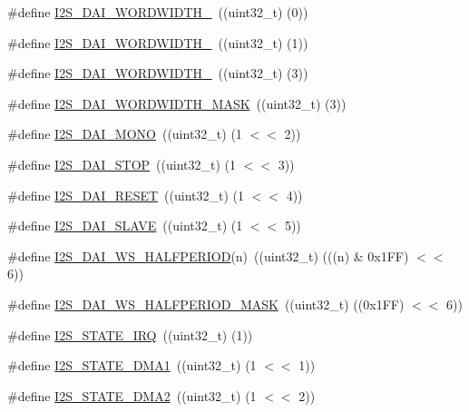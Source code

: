 \begin{DoxyCompactItemize}
\#define \hyperlink{group___i2_s__18_x_x__43_x_x_ga8bd50ada05c4cd981f07be7a3b1002dc}{I2\+S\+\_\+\+D\+A\+I\+\_\+\+W\+O\+R\+D\+W\+I\+D\+T\+H\+\_}~((uint32\+\_\+t) (0))
\item 
\#define \hyperlink{group___i2_s__18_x_x__43_x_x_ga26e60492415a246afde8d4ede5aa292e}{I2\+S\+\_\+\+D\+A\+I\+\_\+\+W\+O\+R\+D\+W\+I\+D\+T\+H\+\_}~((uint32\+\_\+t) (1))
\item 
\#define \hyperlink{group___i2_s__18_x_x__43_x_x_ga576561248aa7e6f27c5ef6c51def80ed}{I2\+S\+\_\+\+D\+A\+I\+\_\+\+W\+O\+R\+D\+W\+I\+D\+T\+H\+\_}~((uint32\+\_\+t) (3))
\item 
\#define \hyperlink{group___i2_s__18_x_x__43_x_x_ga1177f9594c24141162839aafe829fcb9}{I2\+S\+\_\+\+D\+A\+I\+\_\+\+W\+O\+R\+D\+W\+I\+D\+T\+H\+\_\+\+M\+A\+SK}~((uint32\+\_\+t) (3))
\item 
\#define \hyperlink{group___i2_s__18_x_x__43_x_x_ga352feb095d028efc44d17f72beacfae5}{I2\+S\+\_\+\+D\+A\+I\+\_\+\+M\+O\+NO}~((uint32\+\_\+t) (1 $<$$<$ 2))
\item 
\#define \hyperlink{group___i2_s__18_x_x__43_x_x_ga2ed2d2a9f59339ad3cf1f28a78bfcad6}{I2\+S\+\_\+\+D\+A\+I\+\_\+\+S\+T\+OP}~((uint32\+\_\+t) (1 $<$$<$ 3))
\item 
\#define \hyperlink{group___i2_s__18_x_x__43_x_x_gae57a0b564a399a726a9a6737f5733beb}{I2\+S\+\_\+\+D\+A\+I\+\_\+\+R\+E\+S\+ET}~((uint32\+\_\+t) (1 $<$$<$ 4))
\item 
\#define \hyperlink{group___i2_s__18_x_x__43_x_x_ga664f6b8ac38d7b3a23aae4e7a2fa1c6f}{I2\+S\+\_\+\+D\+A\+I\+\_\+\+S\+L\+A\+VE}~((uint32\+\_\+t) (1 $<$$<$ 5))
\item 
\#define \hyperlink{group___i2_s__18_x_x__43_x_x_gab175fcd8e7e80e59833b596a90b16f79}{I2\+S\+\_\+\+D\+A\+I\+\_\+\+W\+S\+\_\+\+H\+A\+L\+F\+P\+E\+R\+I\+OD}(n)~((uint32\+\_\+t) (((n) \& 0x1\+F\+F) $<$$<$ 6))
\item 
\#define \hyperlink{group___i2_s__18_x_x__43_x_x_gaa960b95856c5f78a0eaed42d383dd124}{I2\+S\+\_\+\+D\+A\+I\+\_\+\+W\+S\+\_\+\+H\+A\+L\+F\+P\+E\+R\+I\+O\+D\+\_\+\+M\+A\+SK}~((uint32\+\_\+t) ((0x1\+F\+F) $<$$<$ 6))
\item 
\#define \hyperlink{group___i2_s__18_x_x__43_x_x_gaa412bd295235fcd4d7f0ad284d9386de}{I2\+S\+\_\+\+S\+T\+A\+T\+E\+\_\+\+I\+RQ}~((uint32\+\_\+t) (1))
\item 
\#define \hyperlink{group___i2_s__18_x_x__43_x_x_ga0e9a701addd279db953ca34d56487dbd}{I2\+S\+\_\+\+S\+T\+A\+T\+E\+\_\+\+D\+M\+A1}~((uint32\+\_\+t) (1 $<$$<$ 1))
\item 
\#define \hyperlink{group___i2_s__18_x_x__43_x_x_ga84dfa37fbee79986ec79f4d856b8df24}{I2\+S\+\_\+\+S\+T\+A\+T\+E\+\_\+\+D\+M\+A2}~((uint32\+\_\+t) (1 $<$$<$ 2))

\end{DoxyCompactItemize}

